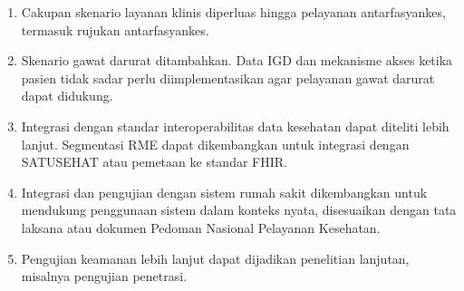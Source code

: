 \begin{enumerate}
	\item Cakupan skenario layanan klinis diperluas hingga pelayanan antarfasyankes, termasuk rujukan antarfasyankes.

	\item Skenario gawat darurat ditambahkan. Data IGD dan mekanisme akses ketika pasien tidak sadar perlu diimplementasikan agar pelayanan gawat darurat dapat didukung.

	\item Integrasi dengan standar interoperabilitas data kesehatan dapat diteliti lebih lanjut. Segmentasi RME dapat dikembangkan untuk integrasi dengan SATUSEHAT atau pemetaan ke standar FHIR.

	\item Integrasi dan pengujian dengan sistem rumah sakit dikembangkan untuk mendukung penggunaan sistem dalam konteks nyata, disesuaikan dengan tata laksana atau dokumen Pedoman Nasional Pelayanan Kesehatan.

	\item Pengujian keamanan lebih lanjut dapat dijadikan penelitian lanjutan, misalnya pengujian penetrasi.
\end{enumerate}